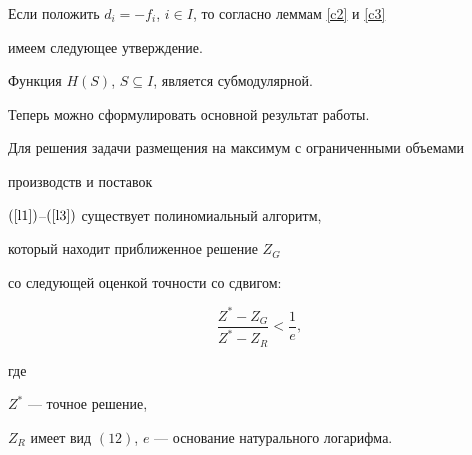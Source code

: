Если положить $d_i=-f_i$, $i \in I$, то согласно леммам \ref{c2} и \ref{c3}


имеем следующее утверждение.





\begin{lem}


\label{c6}


Функция $H(S)$, $S \subseteq I$, является субмодулярной.


\end{lem}





Теперь можно сформулировать основной результат работы.





\begin{thm} 


Для решения задачи размещения на максимум с ограниченными объемами 


производств и поставок


$(\ref{l1})$--$(\ref{l3})$ существует полиномиальный алгоритм,


который находит приближенное решение $Z_G$


со следующей оценкой точности со сдвигом:


\begin{equation}


\frac{Z^* -Z_G}{Z^*- Z_R} < \frac{1}{e},


\end{equation}


где 


$Z^*$ --- точное решение, 


$Z_R$ имеет вид $(12)$, $e$ --- основание натурального логарифма.


\end{thm}





